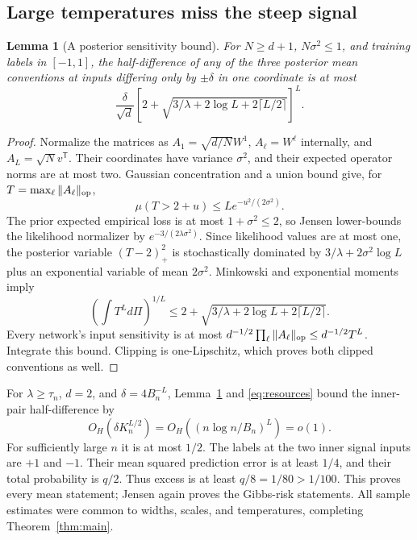 \documentclass[11pt]{article}
\newtheorem{lemma}[theorem]{Lemma}
\begin{document}
\subsection{Large temperatures miss the steep signal}
\begin{lemma}[A posterior sensitivity bound]
\label{lem:sensitivity}
For $N\ge d+1$, $N\sigma^2\le1$, and training labels in $[-1,1]$, the half-difference of any of the three posterior mean conventions at inputs differing only by $\pm\delta$ in one coordinate is at most
\[
 \frac\delta{\sqrt d}
 \left[2+\sqrt{3/\lambda+2\log L+2\lceil L/2\rceil}\right]^L.
\]
\end{lemma}
\begin{proof}
Normalize the matrices as $A_1=\sqrt{d/N}W^1$, $A_\ell=W^\ell$ internally, and $A_L=\sqrt N v^{\mathsf T}$. Their coordinates have variance $\sigma^2$, and their expected operator norms are at most two. Gaussian concentration and a union bound give, for $T=\max_\ell\|A_\ell\|_{\rm op}$,
\[
 \mu(T>2+u)\le L e^{-u^2/(2\sigma^2)}.
\]
The prior expected empirical loss is at most $1+\sigma^2\le2$, so Jensen lower-bounds the likelihood normalizer by $e^{-3/(2\lambda\sigma^2)}$. Since likelihood values are at most one, the posterior variable $(T-2)_+^2$ is stochastically dominated by
$3/\lambda+2\sigma^2\log L$ plus an exponential variable of mean $2\sigma^2$. Minkowski and exponential moments imply
\[
 \left(\int T^L d\Pi\right)^{1/L}
 \le2+\sqrt{3/\lambda+2\log L+2\lceil L/2\rceil}.
\]
Every network's input sensitivity is at most $d^{-1/2}\prod_\ell\|A_\ell\|_{\rm op}\le d^{-1/2}T^L$. Integrate this bound. Clipping is one-Lipschitz, which proves both clipped conventions as well.
\end{proof}

For $\lambda\ge\tau_n$, $d=2$, and $\delta=4B_n^{-L}$, Lemma~\ref{lem:sensitivity} and \eqref{eq:resources} bound the inner-pair half-difference by
\[
 O_H(\delta K_n^{L/2})=O_H\left((n\log n/B_n)^L\right)=o(1).
\]
For sufficiently large $n$ it is at most $1/2$. The labels at the two inner signal inputs are $+1$ and $-1$. Their mean squared prediction error is at least $1/4$, and their total probability is $q/2$. Thus excess is at least $q/8=1/80>1/100$. This proves every mean statement; Jensen again proves the Gibbs-risk statements. All sample estimates were common to widths, scales, and temperatures, completing Theorem~\ref{thm:main}.




\end{document}
